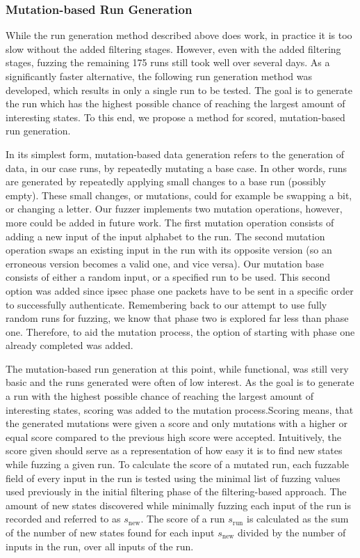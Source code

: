 \subsubsection{Mutation-based Run Generation} \label{subsubsec:mutations}
While the run generation method described above does work, in practice it is too slow without the added filtering stages. However, even with the added filtering stages, fuzzing the remaining 175 runs still took well over several days. As a significantly faster alternative, the following run generation method was developed, which results in only a single run to be tested. The goal is to generate the run which has the highest possible chance of reaching the largest amount of interesting states. To this end, we propose a method for scored, mutation-based run generation. 

In its simplest form, mutation-based data generation refers to the generation of data, in our case runs, by repeatedly mutating a base case. In other words, runs are generated by repeatedly applying small changes to a base run (possibly empty). These small changes, or mutations, could for example be swapping a bit, or changing a letter. Our fuzzer implements two mutation operations, however, more could be added in future work. The first mutation operation consists of adding a new input of the input alphabet to the run. The second mutation operation swaps an existing input in the run with its opposite version (so an erroneous version becomes a valid one, and vice versa). Our mutation base consists of either a random input, or a specified run to be used. This second option was added since \ac{ipsec} phase one packets have to be sent in a specific order to successfully authenticate. Remembering back to our attempt to use fully random runs for fuzzing, we know that phase two is explored far less than phase one. Therefore, to aid the mutation process, the option of starting with phase one already completed was added.

The mutation-based run generation at this point, while functional, was still very basic and the runs generated were often of low interest. As the goal is to generate a run with the highest possible chance of reaching the largest amount of interesting states, scoring was added to the mutation process.Scoring means, that the generated mutations were given a score and only mutations with a higher or equal score compared to the previous high score were accepted. Intuitively, the score given should serve as a representation of how easy it is to find new states while fuzzing a given run. To calculate the score of a mutated run, each fuzzable field of every input in the run is tested using the minimal list of fuzzing values used previously in the initial filtering phase of the filtering-based approach. The amount of new states discovered while minimally fuzzing each input of the run is recorded and referred to as $s_\mathrm{new}$. The score of a run $s_\mathrm{run}$ is calculated as the sum of the number of new states found for each input $s_\mathrm{new}$ divided by the number of inputs in the run, over all inputs of the run.

